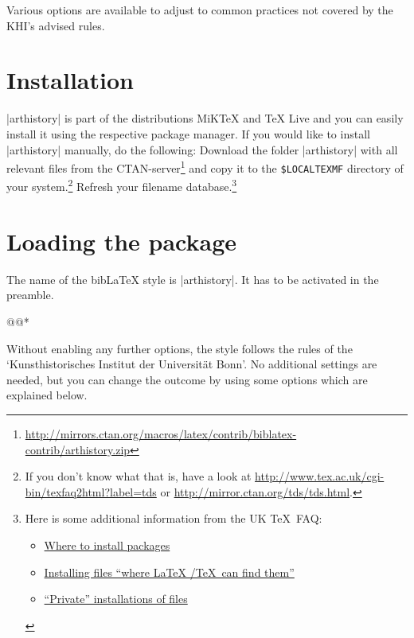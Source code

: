 \documentclass[a4paper,
10pt,
ngerman,
english
]{ltxdoc}
\begin{document}
Various options are available to adjust to common practices not covered by the KHI's advised rules.


\section{Installation}
|arthistory| is part of the distributions MiK\TeX{} %
and \TeX{} Live%
and you can easily install it using the respective package manager. 
If you would like to
install |arthistory| manually, do the following:
Download the folder |arthistory| with all relevant files from the CTAN-server\footnote{\url{http://mirrors.ctan.org/macros/latex/contrib/biblatex-contrib/arthistory.zip}} and copy it to the \texttt{\$LOCALTEXMF} directory of
 your system.\footnote{If you don't know what that is, have a look at
\url{http://www.tex.ac.uk/cgi-bin/texfaq2html?label=tds} or 
\url{http://mirror.ctan.org/tds/tds.html}.} 
Refresh your filename database.\footnote{ 
Here is some additional information from the UK \TeX\ FAQ:
\begin{itemize}[nosep,after=\vspace{-\baselineskip} ]
  \item \href{%
    http://www.tex.ac.uk/cgi-bin/texfaq2html?label=install-where}{%
    Where to install packages}
  \item \href{%
    http://www.tex.ac.uk/cgi-bin/texfaq2html?label=inst-wlcf}{%
    Installing files \enquote{where \LaTeX{} /TeX\ can find them}}
  \item \href{%
    http://www.tex.ac.uk/cgi-bin/texfaq2html?label=privinst}{%
    \enquote{Private} installations of files}
\end{itemize}
}


\section{Loading the package}
  The name of the bib\LaTeX{} style is |arthistory|. It has to be activated in the preamble.

\begin{code}
\usepackage[style=arthistory,%
          *@@*]{biblatex}
@@*
\end{code}

Without enabling any further options, the style follows the rules of the \enquote*{Kunsthistorisches Institut der Universität Bonn}.
No additional settings are needed,
but you can change the outcome by using some options which are explained below.%
\end{document}
